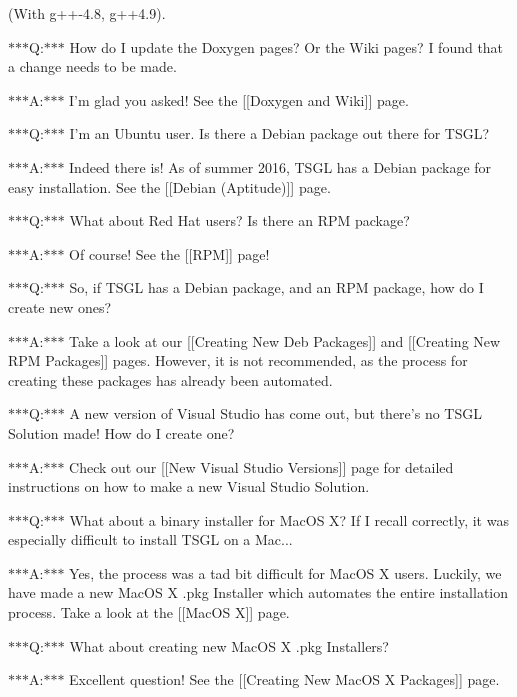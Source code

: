 (With g++-\/4.8, g++4.9).

$\ast$$\ast$$\ast$\-Q\-:$\ast$$\ast$$\ast$ How do I update the Doxygen pages? Or the Wiki pages? I found that a change needs to be made.

$\ast$$\ast$$\ast$\-A\-:$\ast$$\ast$$\ast$ I'm glad you asked! See the \mbox{[}\mbox{[}Doxygen and Wiki\mbox{]}\mbox{]} page.

$\ast$$\ast$$\ast$\-Q\-:$\ast$$\ast$$\ast$ I'm an Ubuntu user. Is there a Debian package out there for T\-S\-G\-L?

$\ast$$\ast$$\ast$\-A\-:$\ast$$\ast$$\ast$ Indeed there is! As of summer 2016, T\-S\-G\-L has a Debian package for easy installation. See the \mbox{[}\mbox{[}Debian (Aptitude)\mbox{]}\mbox{]} page.

$\ast$$\ast$$\ast$\-Q\-:$\ast$$\ast$$\ast$ What about Red Hat users? Is there an R\-P\-M package?

$\ast$$\ast$$\ast$\-A\-:$\ast$$\ast$$\ast$ Of course! See the \mbox{[}\mbox{[}R\-P\-M\mbox{]}\mbox{]} page!

$\ast$$\ast$$\ast$\-Q\-:$\ast$$\ast$$\ast$ So, if T\-S\-G\-L has a Debian package, and an R\-P\-M package, how do I create new ones?

$\ast$$\ast$$\ast$\-A\-:$\ast$$\ast$$\ast$ Take a look at our \mbox{[}\mbox{[}Creating New Deb Packages\mbox{]}\mbox{]} and \mbox{[}\mbox{[}Creating New R\-P\-M Packages\mbox{]}\mbox{]} pages. However, it is not recommended, as the process for creating these packages has already been automated.

$\ast$$\ast$$\ast$\-Q\-:$\ast$$\ast$$\ast$ A new version of Visual Studio has come out, but there's no T\-S\-G\-L Solution made! How do I create one?

$\ast$$\ast$$\ast$\-A\-:$\ast$$\ast$$\ast$ Check out our \mbox{[}\mbox{[}New Visual Studio Versions\mbox{]}\mbox{]} page for detailed instructions on how to make a new Visual Studio Solution.

$\ast$$\ast$$\ast$\-Q\-:$\ast$$\ast$$\ast$ What about a binary installer for Mac\-O\-S X? If I recall correctly, it was especially difficult to install T\-S\-G\-L on a Mac...

$\ast$$\ast$$\ast$\-A\-:$\ast$$\ast$$\ast$ Yes, the process was a tad bit difficult for Mac\-O\-S X users. Luckily, we have made a new Mac\-O\-S X .pkg Installer which automates the entire installation process. Take a look at the \mbox{[}\mbox{[}Mac\-O\-S X\mbox{]}\mbox{]} page.

$\ast$$\ast$$\ast$\-Q\-:$\ast$$\ast$$\ast$ What about creating new Mac\-O\-S X .pkg Installers?

$\ast$$\ast$$\ast$\-A\-:$\ast$$\ast$$\ast$ Excellent question! See the \mbox{[}\mbox{[}Creating New Mac\-O\-S X Packages\mbox{]}\mbox{]} page. 